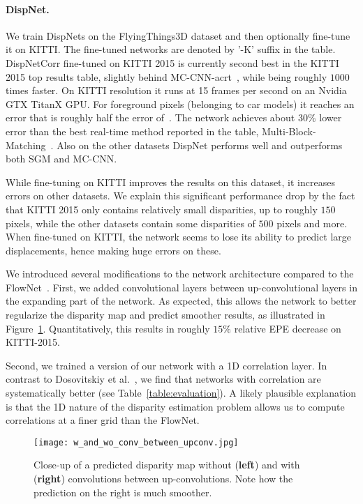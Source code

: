 \documentclass[10pt,twocolumn,letterpaper]{article}
\begin{document}
\paragraph{DispNet.}
We train DispNets on the FlyingThings3D dataset and then optionally fine-tune it on KITTI.
The fine-tuned networks are denoted by '-K' suffix in the table.
DispNetCorr fine-tuned on KITTI 2015 is currently second best in the KITTI 2015 top results table, slightly behind MC-CNN-acrt~\cite{zbontar2015stereo}, while being roughly $1000$ times faster. On KITTI resolution it runs at 15 frames per second on an Nvidia GTX TitanX GPU. 
For foreground pixels (belonging to car models) it reaches an error that is roughly half the error of~\cite{zbontar2015stereo}.
The network achieves about $30 \%$ lower error than the best real-time method reported in the table, Multi-Block-Matching~\cite{EineckeE15}.
Also on the other datasets DispNet performs well and outperforms both SGM and MC-CNN. 

While fine-tuning on KITTI improves the results on this dataset, it increases errors on other datasets.
We explain this significant performance drop by the fact that KITTI 2015 only contains relatively small disparities, up to roughly $150$ pixels, while the other datasets contain some disparities of $500$ pixels and more. 
When fine-tuned on KITTI, the network seems to lose its ability to predict large displacements, hence making huge errors on these.

We introduced several modifications to the network architecture compared to the FlowNet~\cite{FlowNet}.
First, we added convolutional layers between up-convolutional layers in the expanding part of the network. 
As expected, this allows the network to better regularize the disparity map and predict smoother results, as illustrated in Figure~\ref{fig:interconv}. 
Quantitatively, this results in roughly $15 \%$ relative EPE decrease on KITTI-2015.

Second, we trained a version of our network with a 1D correlation layer. 
In contrast to Dosovitskiy et al.~\cite{FlowNet}, we find that networks with correlation are systematically better (see Table~\ref{table:evaluation}).
A likely plausible explanation is that the 1D nature of the disparity estimation problem allows us to compute correlations at a finer grid than the FlowNet. 

\begin{figure}
\texttt{[image: w\_and\_wo\_conv\_between\_upconv.jpg]}
\caption{Close-up of a predicted disparity map without (\textbf{left}) and with (\textbf{right}) convolutions between up-convolutions. Note how the prediction on the right is much smoother.}
\label{fig:interconv}
\end{figure}
\end{document}
